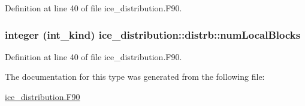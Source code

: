 Definition at line 40 of file ice\_\-distribution.F90.\hypertarget{typeice__distribution_1_1distrb_a77445778980d100ef8889ecbf5e3ab9d}{
\subsubsection[{numLocalBlocks}]{\setlength{\rightskip}{0pt plus 5cm}integer (int\_\-kind) {\bf ice\_\-distribution::distrb::numLocalBlocks}}}
\label{typeice__distribution_1_1distrb_a77445778980d100ef8889ecbf5e3ab9d}


Definition at line 40 of file ice\_\-distribution.F90.

The documentation for this type was generated from the following file:\begin{DoxyCompactItemize}
\item 
\hyperlink{ice__distribution_8F90}{ice\_\-distribution.F90}\end{DoxyCompactItemize}

